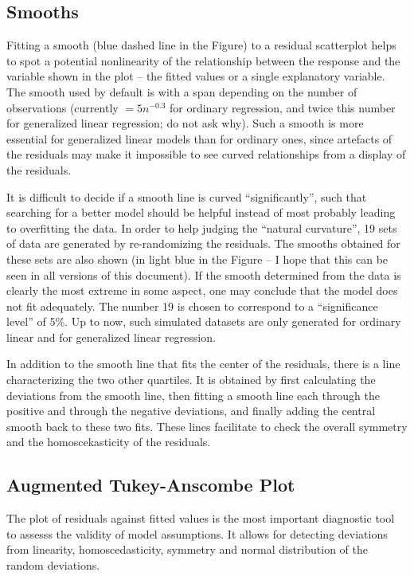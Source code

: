 \documentclass[11pt]{article}\usepackage[]{graphicx}\usepackage[]{color}
\begin{document}
\subsection{Smooths}
Fitting a smooth (blue dashed line in the Figure) 
to a residual scatterplot helps to spot a potential
nonlinearity of the relationship between the response and the variable
shown in the plot -- the fitted values or a single explanatory variable.
The smooth used by default is  with a span depending on the number
of observations (currently $= 5n^{-0.3}$ for ordinary regression, and twice 
this number for generalized linear regression; do not ask why).
Such a smooth is more essential for generalized linear models than for 
ordinary ones, since artefacts of the residuals may make it impossible to 
see curved relationships from a display of the residuals.

It is difficult to decide if a smooth line is curved ``significantly'',
such that searching for a better model should be helpful instead of most
probably leading to overfitting the data.
In order to help judging the ``natural curvature'', 19 sets of data are
generated by 
re-randomizing the residuals. 
The smooths obtained for these sets are also shown (in light blue in the
Figure -- I hope that this can be seen in all versions of this document).
If the smooth determined from the data is clearly the most extreme in some
aspect, one may conclude that the model does not fit adequately.
The number 19 is chosen to correspond to a ``significance level'' of 5\%.
Up to now, such simulated datasets are only generated for ordinary linear
and for generalized linear regression. 

In addition to the smooth line that fits the center of the residuals,
there is a line characterizing the two other quartiles. 
It is obtained by first calculating the deviations from the smooth line,
then fitting a smooth line each through the positive and through the
negative deviations, and finally adding the central smooth back to these
two fits.
These lines facilitate to check the overall symmetry and the
homoscekasticity of the residuals.

\subsection{Augmented Tukey-Anscombe Plot}
The plot of residuals against fitted values is the most important
diagnostic tool to assesss the validity of model assumptions.
It allows for detecting deviations from linearity, homoscedasticity,
symmetry and normal distribution of the random deviations.
\end{document}
